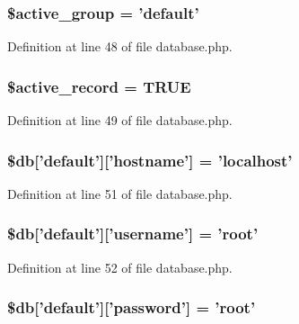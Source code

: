 \subsubsection[{\$active\-\_\-group}]{\setlength{\rightskip}{0pt plus 5cm}\$active\-\_\-group = 'default'}\label{development_2database_8php_a5046ea83a698c5b7bbf6ffd3dd816b65}


Definition at line 48 of file database.\-php.

\subsubsection[{\$active\-\_\-record}]{\setlength{\rightskip}{0pt plus 5cm}\$active\-\_\-record = T\-R\-U\-E}\label{development_2database_8php_a228b6ea91602f48a8831d0dc94809b94}


Definition at line 49 of file database.\-php.

\subsubsection[{\$db}]{\setlength{\rightskip}{0pt plus 5cm}\$db['default']['hostname'] = 'localhost'}\label{development_2database_8php_a987b8cb0ae83b9519cb7c36fe25dbdd8}


Definition at line 51 of file database.\-php.

\subsubsection[{\$db}]{\setlength{\rightskip}{0pt plus 5cm}\$db['default']['username'] = 'root'}\label{development_2database_8php_a2f535f16fa00521992cfc791c8dcec37}


Definition at line 52 of file database.\-php.

\subsubsection[{\$db}]{\setlength{\rightskip}{0pt plus 5cm}\$db['default']['password'] = 'root'}\label{development_2database_8php_a1f6afce218438d9f7d13e28ee602e29b}


